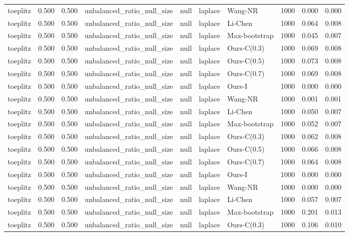 \begin{tabular}{lrrllllrrr}
toeplitz & 0.500 & 0.500 & unbalanced\_ratio\_null\_size & null & laplace & Wang-NR & 1000 & 0.000 & 0.000 \\
toeplitz & 0.500 & 0.500 & unbalanced\_ratio\_null\_size & null & laplace & Li-Chen & 1000 & 0.064 & 0.008 \\
toeplitz & 0.500 & 0.500 & unbalanced\_ratio\_null\_size & null & laplace & Max-bootstrap & 1000 & 0.045 & 0.007 \\
toeplitz & 0.500 & 0.500 & unbalanced\_ratio\_null\_size & null & laplace & Ours-C(0.3) & 1000 & 0.069 & 0.008 \\
toeplitz & 0.500 & 0.500 & unbalanced\_ratio\_null\_size & null & laplace & Ours-C(0.5) & 1000 & 0.073 & 0.008 \\
toeplitz & 0.500 & 0.500 & unbalanced\_ratio\_null\_size & null & laplace & Ours-C(0.7) & 1000 & 0.069 & 0.008 \\
toeplitz & 0.500 & 0.500 & unbalanced\_ratio\_null\_size & null & laplace & Ours-I & 1000 & 0.000 & 0.000 \\
toeplitz & 0.500 & 0.500 & unbalanced\_ratio\_null\_size & null & laplace & Wang-NR & 1000 & 0.001 & 0.001 \\
toeplitz & 0.500 & 0.500 & unbalanced\_ratio\_null\_size & null & laplace & Li-Chen & 1000 & 0.050 & 0.007 \\
toeplitz & 0.500 & 0.500 & unbalanced\_ratio\_null\_size & null & laplace & Max-bootstrap & 1000 & 0.052 & 0.007 \\
toeplitz & 0.500 & 0.500 & unbalanced\_ratio\_null\_size & null & laplace & Ours-C(0.3) & 1000 & 0.062 & 0.008 \\
toeplitz & 0.500 & 0.500 & unbalanced\_ratio\_null\_size & null & laplace & Ours-C(0.5) & 1000 & 0.066 & 0.008 \\
toeplitz & 0.500 & 0.500 & unbalanced\_ratio\_null\_size & null & laplace & Ours-C(0.7) & 1000 & 0.064 & 0.008 \\
toeplitz & 0.500 & 0.500 & unbalanced\_ratio\_null\_size & null & laplace & Ours-I & 1000 & 0.000 & 0.000 \\
toeplitz & 0.500 & 0.500 & unbalanced\_ratio\_null\_size & null & laplace & Wang-NR & 1000 & 0.000 & 0.000 \\
toeplitz & 0.500 & 0.500 & unbalanced\_ratio\_null\_size & null & laplace & Li-Chen & 1000 & 0.057 & 0.007 \\
toeplitz & 0.500 & 0.500 & unbalanced\_ratio\_null\_size & null & laplace & Max-bootstrap & 1000 & 0.201 & 0.013 \\
toeplitz & 0.500 & 0.500 & unbalanced\_ratio\_null\_size & null & laplace & Ours-C(0.3) & 1000 & 0.106 & 0.010 \\

\end{tabular}
